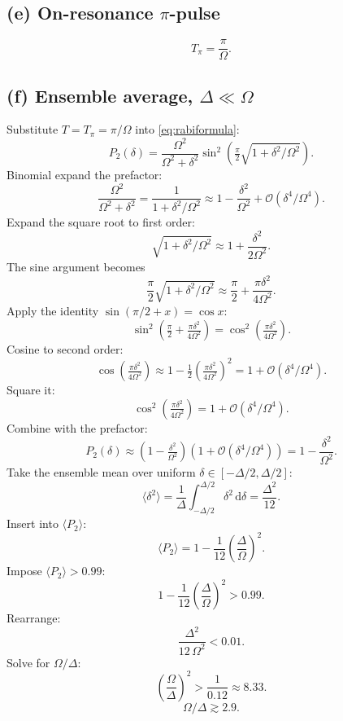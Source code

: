 \documentclass[11pt]{article}
\newcommand{\de}{\mathrm{d}}
\begin{document}
\subsection*{(e) On-resonance $\pi$-pulse}

\begin{equation}
\boxed{\;T_\pi = \frac{\pi}{\Omega}.\;}
\label{eq:Tpi}
\end{equation}

\subsection*{(f) Ensemble average, $\Delta\ll\Omega$}

Substitute $T=T_\pi=\pi/\Omega$ into \eqref{eq:rabiformula}:
\[
P_2(\delta) = \frac{\Omega^{2}}{\Omega^{2}+\delta^{2}}\sin^{2}\!\left(\tfrac{\pi}{2}\sqrt{1+\delta^{2}/\Omega^{2}}\right).
\]
Binomial expand the prefactor:
\[
\frac{\Omega^{2}}{\Omega^{2}+\delta^{2}} = \frac{1}{1+\delta^{2}/\Omega^{2}} \approx 1 - \frac{\delta^{2}}{\Omega^{2}} + \mathcal O(\delta^{4}/\Omega^{4}).
\]
Expand the square root to first order:
\[
\sqrt{1+\delta^{2}/\Omega^{2}} \approx 1 + \frac{\delta^{2}}{2\Omega^{2}}.
\]
The sine argument becomes
\[
\frac{\pi}{2}\sqrt{1+\delta^{2}/\Omega^{2}} \approx \frac{\pi}{2} + \frac{\pi\delta^{2}}{4\Omega^{2}}.
\]
Apply the identity $\sin(\pi/2+x)=\cos x$:
\[
\sin^{2}\!\left(\tfrac{\pi}{2} + \tfrac{\pi\delta^{2}}{4\Omega^{2}}\right) = \cos^{2}\!\left(\tfrac{\pi\delta^{2}}{4\Omega^{2}}\right).
\]
Cosine to second order:
\[
\cos\!\left(\tfrac{\pi\delta^{2}}{4\Omega^{2}}\right) \approx 1 - \tfrac{1}{2}\!\left(\tfrac{\pi\delta^{2}}{4\Omega^{2}}\right)^{2} = 1 + \mathcal O(\delta^{4}/\Omega^{4}).
\]
Square it:
\[
\cos^{2}\!\left(\tfrac{\pi\delta^{2}}{4\Omega^{2}}\right) = 1 + \mathcal O(\delta^{4}/\Omega^{4}).
\]
Combine with the prefactor:
\[
P_2(\delta) \approx \left(1 - \tfrac{\delta^{2}}{\Omega^{2}}\right)\!\left(1 + \mathcal O(\delta^{4}/\Omega^{4})\right) = 1 - \frac{\delta^{2}}{\Omega^{2}}.
\]
Take the ensemble mean over uniform $\delta\in[-\Delta/2,\Delta/2]$:
\[
\langle\delta^2\rangle = \frac{1}{\Delta}\int_{-\Delta/2}^{\Delta/2}\!\delta^2\,\de\delta = \frac{\Delta^2}{12}.
\]
Insert into $\langle P_2\rangle$:
\begin{equation}
\boxed{\;\langle P_2\rangle = 1 - \frac{1}{12}\!\left(\frac{\Delta}{\Omega}\right)^{2}.\;}
\label{eq:Pavg}
\end{equation}
Impose $\langle P_2\rangle > 0.99$:
\[
1 - \frac{1}{12}\!\left(\frac{\Delta}{\Omega}\right)^{2} > 0.99.
\]
Rearrange:
\[
\frac{\Delta^{2}}{12\,\Omega^{2}} < 0.01.
\]
Solve for $\Omega/\Delta$:
\[
\left(\frac{\Omega}{\Delta}\right)^{2} > \frac{1}{0.12} \approx 8.33.
\]
\begin{equation}
\boxed{\;\Omega/\Delta \gtrsim 2.9.\;}
\end{equation}
\end{document}
